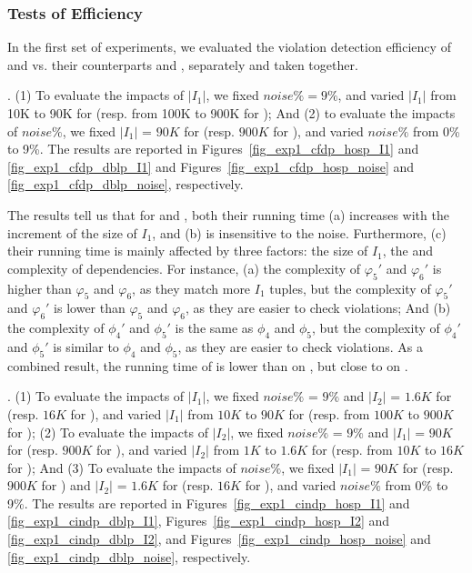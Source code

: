 \vspace{-1ex}
\subsubsection{Tests of Efficiency}


In the first set of experiments, we evaluated the violation detection efficiency of  \pCFDs and \pCINDs vs. their counterparts \CFDs and \CINDs, separately and taken together.

.
(1) To evaluate the impacts of $|I_1|$, we fixed $noise\% = 9\%$, and varied $|I_1|$ from 10K to 90K for \hosp (resp. from 100K to 900K for \dblp); And (2) to evaluate the impacts of $noise\%$, we fixed $|I_1|$ = $90K$ for \hosp (resp. $900K$ for \dblp), and varied $noise\%$ from 0\% to 9\%.
%
The results are reported in Figures~\ref{fig_exp1_cfdp_hosp_I1} and \ref{fig_exp1_cfdp_dblp_I1} and Figures~\ref{fig_exp1_cfdp_hosp_noise} and \ref{fig_exp1_cfdp_dblp_noise}, respectively.


The results tell us that for \CFDs and \pCFDs, both their running time (a) increases with the increment of the size of $I_1$, and (b) is insensitive to the noise. Furthermore, (c) their running time is mainly affected by three factors: the size of $I_1$, the \LHS and \RHS complexity of dependencies.
For instance, (a) the \LHS complexity of \CFDs $\varphi_5'$ and $\varphi_6'$ is higher than \pCFDs $\varphi_5$ and $\varphi_6$, as they match more $I_1$ tuples, but the \RHS complexity of \CFDs $\varphi_5'$ and $\varphi_6'$ is lower than \pCFDs $\varphi_5$ and $\varphi_6$, as they are easier to check violations; And
(b) the \LHS complexity of \CFDs $\phi_4'$ and $\phi_5'$ is the same as  \pCFDs $\phi_4$ and $\phi_5$, but
 the \RHS complexity of \CFDs $\phi_4'$ and $\phi_5'$ is similar to \pCFDs $\phi_4$ and $\phi_5$, as they are easier to check violations.
As a combined result, the running time of \CFDs is lower than \pCFDs on \hosp, but close to \pCFDs on \dblp.




\vspace{-1ex}
.
(1) To evaluate the impacts of $|I_1|$, we fixed $noise\%$ = $9\%$ and $|I_2|$ = $1.6K$ for \hosp (resp. $16K$ for \dblp), and varied $|I_1|$ from  $10K$ to $90K$ for \hosp (resp. from $100K$ to $900K$ for \dblp);
%
(2) To evaluate the impacts of $|I_2|$, we fixed $noise\%$ = $9\%$ and $|I_1|$ = $90K$ for \hosp (resp. $900K$ for \dblp), and varied $|I_2|$ from  $1K$ to $1.6K$ for \hosp (resp. from $10K$ to $16K$ for \dblp); And
%
(3) To evaluate the impacts of $noise\%$, we fixed $|I_1|$ = $90K$ for \hosp (resp. $900K$ for \dblp) and $|I_2|$ = $1.6K$ for \hosp (resp. $16K$ for \dblp), and varied  $noise\%$ from 0\% to 9\%.
%
The results are reported in Figures~\ref{fig_exp1_cindp_hosp_I1} and \ref{fig_exp1_cindp_dblp_I1},  Figures~\ref{fig_exp1_cindp_hosp_I2} and \ref{fig_exp1_cindp_dblp_I2}, and Figures~\ref{fig_exp1_cindp_hosp_noise} and \ref{fig_exp1_cindp_dblp_noise}, respectively.





